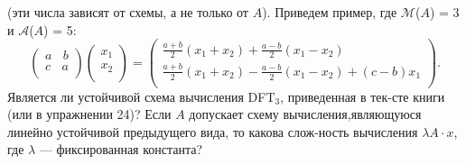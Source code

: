 \documentclass{mai_book}
\begin{document}
(эти числа зависят от схемы, а не только от $A$). Приведем пример, где\linebreak
 $\mathcal{M}$($A$) = 3 и $\mathcal{A}$($A$) = 5:\linebreak
$$
\left(\begin{array}{cc}
 a~~~~b\\
  c~~~~ a\\
\end{array}\right)
\left(\begin{array}{c}
  x_1\\
  x_2\\
\end{array}\right) = 
\left(\begin{array}{c}
 \frac{a+b}{2}(x_1+x_2)+\frac{a-b}{2}(x_1-x_2) \\
  \frac{a+b}{2}(x_1+x_2)-\frac{a-b}{2}(x_1-x_2) + (c-b)x_1\\
\end{array}\right).
$$
Является ли устойчивой схема вычисления D{\footnotesize FT}$_3$, приведенная в тек-\linebreak сте книги (или в упражнении 24)? Если $A$ допускает схему вычисления,\linebreak являющуюся линейно устойчивой предыдущего вида, то какова слож-\linebreak ность вычисления $\lambda A \cdot x$, где $\lambda$ — фиксированная константа?
\end{document}
